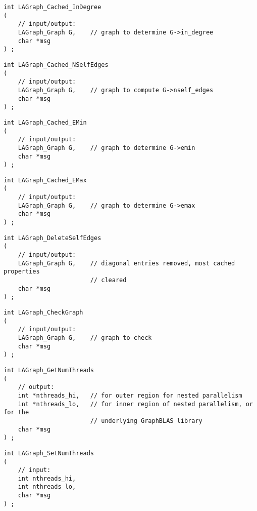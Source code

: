 \begin{verbatim}
int LAGraph_Cached_InDegree
(
    // input/output:
    LAGraph_Graph G,    // graph to determine G->in_degree
    char *msg
) ;
\end{verbatim}




\begin{verbatim}
int LAGraph_Cached_NSelfEdges
(
    // input/output:
    LAGraph_Graph G,    // graph to compute G->nself_edges
    char *msg
) ;
\end{verbatim}




\begin{verbatim}
int LAGraph_Cached_EMin
(
    // input/output:
    LAGraph_Graph G,    // graph to determine G->emin
    char *msg
) ;
\end{verbatim}




\begin{verbatim}
int LAGraph_Cached_EMax
(
    // input/output:
    LAGraph_Graph G,    // graph to determine G->emax
    char *msg
) ;
\end{verbatim}




\begin{verbatim}
int LAGraph_DeleteSelfEdges
(
    // input/output:
    LAGraph_Graph G,    // diagonal entries removed, most cached properties
                        // cleared
    char *msg
) ;
\end{verbatim}




\begin{verbatim}
int LAGraph_CheckGraph
(
    // input/output:
    LAGraph_Graph G,    // graph to check
    char *msg
) ;
\end{verbatim}




\begin{verbatim}
int LAGraph_GetNumThreads
(
    // output:
    int *nthreads_hi,   // for outer region for nested parallelism
    int *nthreads_lo,   // for inner region of nested parallelism, or for the
                        // underlying GraphBLAS library
    char *msg
) ;
\end{verbatim}




\begin{verbatim}
int LAGraph_SetNumThreads
(
    // input:
    int nthreads_hi,
    int nthreads_lo,
    char *msg
) ;
\end{verbatim}




